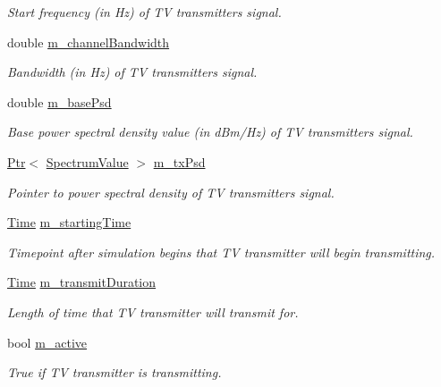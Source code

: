 \begin{DoxyCompactItemize}
\begin{DoxyCompactList}\small\item\em Start frequency (in Hz) of TV transmitter\textquotesingle{}s signal. \end{DoxyCompactList}\item 
double \hyperlink{classns3_1_1TvSpectrumTransmitter_a6e9866a446454a46b3a64be122931c95}{m\+\_\+channel\+Bandwidth}
\begin{DoxyCompactList}\small\item\em Bandwidth (in Hz) of TV transmitter\textquotesingle{}s signal. \end{DoxyCompactList}\item 
double \hyperlink{classns3_1_1TvSpectrumTransmitter_a2d1d8e8127f61ed696bee9acf2ea2de2}{m\+\_\+base\+Psd}
\begin{DoxyCompactList}\small\item\em Base power spectral density value (in d\+Bm/\+Hz) of TV transmitter\textquotesingle{}s signal. \end{DoxyCompactList}\item 
\hyperlink{classns3_1_1Ptr}{Ptr}$<$ \hyperlink{classns3_1_1SpectrumValue}{Spectrum\+Value} $>$ \hyperlink{classns3_1_1TvSpectrumTransmitter_add26555fe4d51eb5d9a757a54dc36dd0}{m\+\_\+tx\+Psd}
\begin{DoxyCompactList}\small\item\em Pointer to power spectral density of TV transmitter\textquotesingle{}s signal. \end{DoxyCompactList}\item 
\hyperlink{classns3_1_1Time}{Time} \hyperlink{classns3_1_1TvSpectrumTransmitter_a792038cd396efdc81c8f6ee2d54a0fd2}{m\+\_\+starting\+Time}
\begin{DoxyCompactList}\small\item\em Timepoint after simulation begins that TV transmitter will begin transmitting. \end{DoxyCompactList}\item 
\hyperlink{classns3_1_1Time}{Time} \hyperlink{classns3_1_1TvSpectrumTransmitter_a3194786c04a42f635dde6f56b317f75b}{m\+\_\+transmit\+Duration}
\begin{DoxyCompactList}\small\item\em Length of time that TV transmitter will transmit for. \end{DoxyCompactList}\item 
bool \hyperlink{classns3_1_1TvSpectrumTransmitter_a474fa631e8aaa85445b0ba463b20b61b}{m\+\_\+active}
\begin{DoxyCompactList}\small\item\em True if TV transmitter is transmitting. \end{DoxyCompactList}\end{DoxyCompactItemize}
